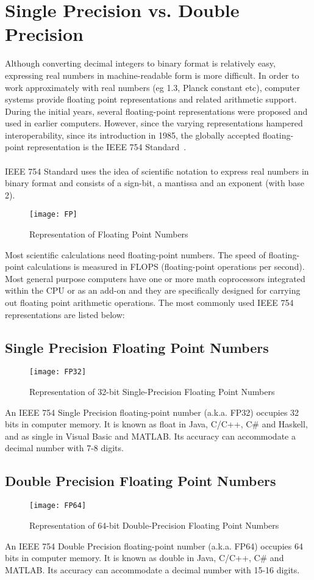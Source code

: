 \documentclass[thesis.tex]{subfiles}
\begin{document}
\section{Single Precision vs. Double Precision }\label{sec:spvsdp}
Although converting decimal integers to binary format is relatively easy, expressing real numbers in machine-readable form is more difficult. In order to work approximately with real numbers (eg 1.3, Planck constant etc), computer systems provide floating point representations and related arithmetic support. During the initial years, several floating-point representations were proposed and used in earlier computers. However, since the varying representations hampered interoperability, since its introduction in 1985, the globally accepted floating-point representation is the IEEE 754 Standard~\cite{IEEE754}.\\\\
IEEE 754 Standard uses the idea of scientific notation to express real numbers in binary format and consists of a sign-bit, a mantissa and an exponent (with base 2).
\begin{figure}[H]
	\centering
	\texttt{[image: FP]}
	\caption{Representation of Floating Point Numbers}
	\label{fig:FP}
\end{figure}
Most scientific calculations need floating-point numbers. The speed of floating-point calculations is measured in FLOPS (floating-point operations per second). Most general purpose computers have one or more math coprocessors integrated within the CPU or as an add-on and they are specifically designed for carrying out floating point arithmetic operations. The most commonly used IEEE 754 representations are listed below:
\subsection{Single Precision Floating Point Numbers}
\begin{figure}[H]
	\centering
	\texttt{[image: FP32]}
	\caption{Representation of 32-bit Single-Precision Floating Point Numbers}
	\label{fig:FP32}
\end{figure}
An IEEE 754 Single Precision floating-point number (a.k.a. FP32) occupies 32 bits in computer memory. It is known as float in Java, C/C++, C\# and Haskell, and as single in Visual Basic and MATLAB. Its accuracy can accommodate a decimal number with 7-8 digits.

\subsection{Double Precision Floating Point Numbers}
\begin{figure}[H]
	\centering
	\texttt{[image: FP64]}
	\caption{Representation of 64-bit Double-Precision Floating Point Numbers}
	\label{fig:FP64}
\end{figure}
An IEEE 754 Double Precision floating-point number (a.k.a. FP64) occupies 64 bits in computer memory. It is known as double in Java, C/C++, C\# and MATLAB. Its accuracy can accommodate a decimal number with 15-16 digits.
\end{document}
